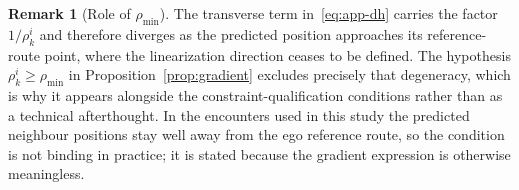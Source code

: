 \documentclass[11pt]{article}
\theoremstyle{plain}
\theoremstyle{definition}
\newtheorem{remark}{Remark}
\begin{document}
\begin{remark}[Role of $\rho_{\min}$]
	\label{rem:rhomin}
	The transverse term in~\eqref{eq:app-dh} carries the factor
	$1/\rho^{i}_{k}$ and therefore diverges as the predicted position
	approaches its reference-route point, where the linearization
	direction ceases to be defined. The hypothesis
	$\rho^{i}_{k}\geq\rho_{\min}$ in
	Proposition~\ref{prop:gradient} excludes precisely that degeneracy,
	which is why it appears alongside the constraint-qualification
	conditions rather than as a technical afterthought. In the
	encounters used in this study the predicted neighbour positions stay
	well away from the ego reference route, so the condition is not
	binding in practice; it is stated because the gradient expression is
	otherwise meaningless.
\end{remark}
\end{document}
